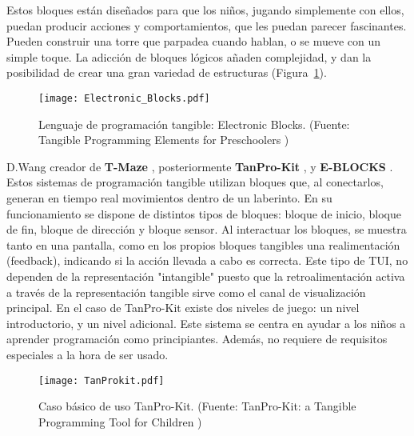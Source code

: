 Estos bloques están diseñados para que los niños, jugando simplemente con ellos, puedan producir acciones y comportamientos, que les puedan parecer fascinantes. Pueden construir una torre que parpadea cuando hablan, o se mueve con un simple toque. La adicción de bloques lógicos añaden complejidad, y dan la posibilidad de crear una gran variedad de estructuras (Figura~\ref{fig:ElectronicBlocks}).

\begin{figure}[!h]
\begin{center}
\texttt{[image: Electronic\_Blocks.pdf]}
\caption{Lenguaje de programación tangible: Electronic Blocks. (Fuente: Tangible Programming Elements for Preschoolers \cite{Wyeth})}
\label{fig:ElectronicBlocks}
\end{center}
\end{figure}


D.Wang creador de \textbf{T-Maze} \cite{Wang_T-Maze}, posteriormente \textbf{TanPro-Kit} \cite{Wang_TanPro-kit}, y \textbf{E-BLOCKS} \cite{Wang_E-BLOCKS}. Estos sistemas de programación tangible utilizan bloques que, al conectarlos, generan en tiempo real movimientos dentro de un laberinto. En su funcionamiento se dispone de distintos tipos de bloques: bloque de inicio, bloque de fin, bloque de dirección y bloque sensor. Al interactuar los bloques, se muestra tanto en una pantalla, como en los propios bloques tangibles una realimentación (feedback), indicando si la acción llevada a cabo es correcta. Este tipo de TUI, no dependen de la representación "intangible" puesto que la retroalimentación activa a través de la representación tangible sirve como el canal de visualización principal.
En el caso de TanPro-Kit existe dos niveles de juego: un nivel introductorio, y un nivel adicional. Este sistema se centra en ayudar a los niños a aprender programación como principiantes. Además, no requiere de requisitos especiales a la hora de ser usado.


\begin{figure}[!h]
\begin{center}
\texttt{[image: TanProkit.pdf]}
\caption{Caso básico de uso TanPro-Kit. (Fuente: TanPro-Kit: a Tangible Programming Tool for Children \cite{Wang_TanPro-kit})}
\label{fig:TanProKit}
\end{center}
\end{figure}


